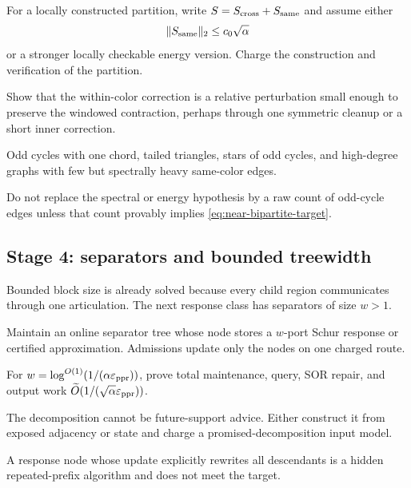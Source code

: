 \begin{description}[leftmargin=2.7cm,style=nextline]
\item[Structural hypothesis]
For a locally constructed partition, write
$S=S_{\rm cross}+S_{\rm same}$ and assume either
\begin{equation}
 \|S_{\rm same}\|_2\leq c_0\sqrt\alpha
 \label{eq:near-bipartite-target}
\end{equation}
or a stronger locally checkable energy version.  Charge the construction and
verification of the partition.
\item[Target theorem]
Show that the within-color correction is a relative perturbation small enough
to preserve the windowed contraction, perhaps through one symmetric cleanup
or a short inner correction.
\item[Counterexamples]
Odd cycles with one chord, tailed triangles, stars of odd cycles, and
high-degree graphs with few but spectrally heavy same-color edges.
\item[Stop condition]
Do not replace the spectral or energy hypothesis by a raw count of odd-cycle
edges unless that count provably implies \eqref{eq:near-bipartite-target}.
\end{description}

\subsection{Stage 4: separators and bounded treewidth}

Bounded block size is already solved because every child region communicates
through one articulation.  The next response class has separators of size
$w>1$.

\begin{description}[leftmargin=2.7cm,style=nextline]
\item[Representation]
Maintain an online separator tree whose node stores a $w$-port Schur response
or certified approximation.  Admissions update only the nodes on one charged
route.
\item[Target scale]
For $w=\log^{O(1)}(1/(\alpha\varepsilon_{\rm ppr}))$, prove total maintenance,
query, SOR repair, and output work
$\widetilde O(1/(\sqrt\alpha\varepsilon_{\rm ppr}))$.
\item[Hard obligation]
The decomposition cannot be future-support advice.  Either construct it from
exposed adjacency or state and charge a promised-decomposition input model.
\item[Stop condition]
A response node whose update explicitly rewrites all descendants is a hidden
repeated-prefix algorithm and does not meet the target.
\end{description}

